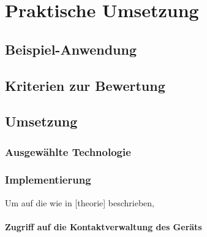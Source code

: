 \chapter{Praktische Umsetzung} \label{chap:praxis} %

	\section{Beispiel-Anwendung}\label{sec:bsp-app} %

	\section{Kriterien zur Bewertung}\label{sec:kriterien}

\section{Umsetzung} \label{sec:umsetzung}

\subsection{Ausgewählte Technologie} %
\subsection{Implementierung} %

Um auf die wie in [theorie] beschrieben, 
		
\subsubsection{Zugriff auf die Kontaktverwaltung des Geräts}

